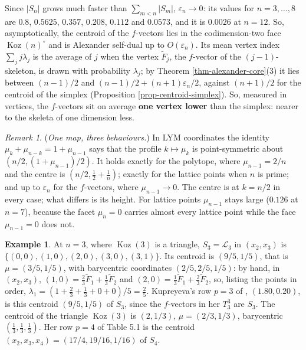 \documentclass[11pt, a4paper, abstract=yes]{scrartcl}
\theoremstyle{definition}
\newtheorem{mexample}[definition]{Example}
\theoremstyle{remark}
\newtheorem{remark}[definition]{Remark}
\theoremstyle{plain}
\theoremstyle{remark}
\theoremstyle{plain}
\newcommand{\Koz}{\operatorname{Koz}}
\let\autocite\cite
\begin{document}
Since \(\lvert S_n\rvert\) grows much faster than \(\sum_{m<n}\lvert S_m\rvert\),
\(\varepsilon_n\to0\): its values for \(n=3,\dots,8\) are \(0.8\), \(0.5625\), \(0.357\), \(0.208\),
\(0.112\) and \(0.0573\), and it is \(0.0026\) at \(n=12\). So, asymptotically, the centroid of the
\(f\)-vectors lies in the codimension-two face \(\Koz(n)^\circ\) and is Alexander self-dual up to
\(O(\varepsilon_n)\). Its mean vertex index \(\sum_jj\lambda_j\) is the average of \(j\) when the
vertex \(\tilde F_j\), the \(f\)-vector of the \((j-1)\)-skeleton, is drawn with probability
\(\lambda_j\); by Theorem \ref{thm-alexander-core}(3) it lies between \((n-1)/2\) and
\((n-1)/2+(n+1)\varepsilon_n/2\), against
\((n+1)/2\) for the centroid of the simplex (Proposition \ref{prop-centroid-simplex}). So, measured in
vertices, the \(f\)-vectors sit on average \textbf{one vertex lower} than the simplex: nearer to the skeleta
of one dimension less.

\begin{remark}
(\emph{One map, three behaviours.}) In LYM coordinates the identity
\(\mu_k+\mu_{n-k}=1+\mu_{n-1}\) says that the profile \(k\mapsto\mu_k\) is point-symmetric about
\((n/2,(1+\mu_{n-1})/2)\). It holds exactly for the polytope, where \(\mu_{n-1}=2/n\) and the centre
is \((n/2,\tfrac12+\tfrac1n)\); exactly for the lattice points when \(n\) is prime; and up to
\(\varepsilon_n\) for the \(f\)-vectors, where \(\mu_{n-1}\to0\). The centre is at \(k=n/2\) in every
case; what differs is its height. For lattice points \(\mu_{n-1}\) stays large (\(0.126\) at \(n=7\)),
because the facet \(\mu_n=0\) carries almost every lattice point while the face \(\mu_{n-1}=0\) does
not.
\label{rem-one-map}
\end{remark}

\begin{mexample}
At \(n=3\), where \(\Koz(3)\) is a triangle, \(S_3=\mathcal L_3\) in \((x_2,x_3)\) is \(\lbrace(0,0),(1,0),(2,0),(3,0),(3,1)\rbrace\). Its
centroid is \((9/5,1/5)\), that is \(\mu=(3/5,1/5)\), with barycentric coordinates
\((2/5,2/5,1/5)\): by hand, in \((x_2,x_3)\), \((1,0)=\tfrac23\tilde F_1+\tfrac13\tilde F_2\) and
\((2,0)=\tfrac13\tilde F_1+\tfrac23\tilde F_2\), so, listing the points in order,
\(\lambda_1=(1+\tfrac23+\tfrac13+0+0)/5=\tfrac25\). Kupreyeva's row \(p=3\) of
\autocite[Table 4.2]{Kupreyeva2019}, \((1.80,0.20)\), is this centroid \((9/5,1/5)\) of \(S_3\), since the
\(f\)-vectors in her \(T^3_3\) are \(S_3\). The centroid of the triangle \(\Koz(3)\) is \((2,1/3)\), \(\mu=(2/3,1/3)\),
barycentric \((\tfrac13,\tfrac13,\tfrac13)\). Her row \(p=4\) of Table 5.1 is the centroid
\((x_2,x_3,x_4)=(17/4,19/16,1/16)\) of \(S_4\).
\label{ex-centroid-n3}
\end{mexample}
\end{document}
